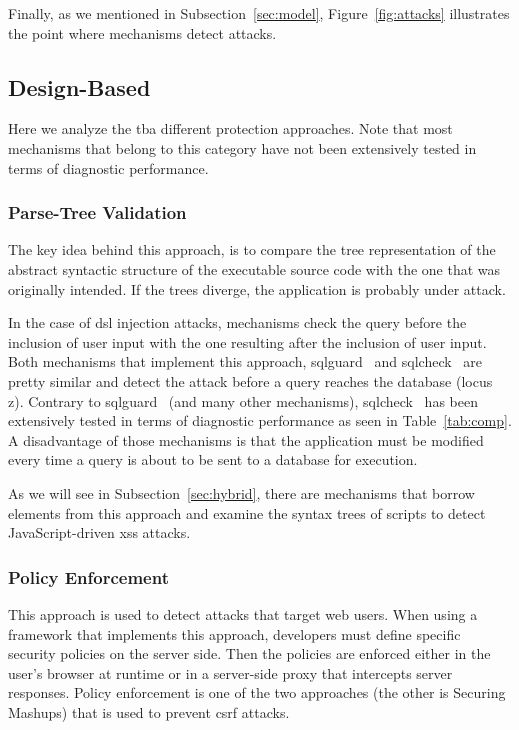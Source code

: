 \documentclass[conference]{IEEEtran}
\begin{document}
Finally, as we mentioned in Subsection~\ref{sec:model},
Figure~\ref{fig:attacks} illustrates the point where
mechanisms detect attacks.

\subsection{Design-Based}
\label{sec:prot}

Here we analyze the {\sc tba} different protection approaches.
Note that most mechanisms that belong to this category have
not been extensively tested in terms of diagnostic performance.

\subsubsection{Parse-Tree Validation}
\label{sec:tree}

The key idea behind this approach, is to compare
the tree representation of the abstract syntactic
structure of the executable source code
with the one that was originally intended.
If the trees diverge, the application is probably
under attack.

In the case of {\sc dsl} injection attacks, mechanisms check 
the query before the inclusion of user input with the one
resulting after the inclusion of user input.
Both mechanisms that implement this approach,
{\sc sqlg}uard~\cite{BWS05} and
{\sc sql}check~\cite{SW06} are pretty similar
and detect the attack before a query reaches the
database (locus {\sc z}).
Contrary to {\sc sqlg}uard~\cite{BWS05} (and many other
mechanisms), {\sc sql}check~\cite{SW06} has been
extensively tested in terms of diagnostic performance
as seen in Table~\ref{tab:comp}. A disadvantage of
those mechanisms is that the application must be modified
every time a query is about to be sent to a database
for execution.

As we will see in Subsection~\ref{sec:hybrid},
there are mechanisms that borrow elements from
this approach and examine the syntax trees
of scripts to detect JavaScript-driven {\sc xss} attacks.

\subsubsection{Policy Enforcement}

This approach is used to detect attacks that target web users.
When using a framework that implements
this approach, developers must define
specific security policies on the server side.
Then the policies are enforced either in the user's
browser at runtime or in a server-side proxy that intercepts
server responses. Policy enforcement is one of the two
approaches (the other is Securing Mashups) that is
used to prevent {\sc csrf} attacks.
\end{document}
